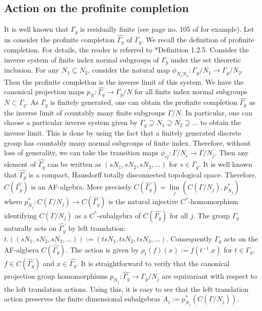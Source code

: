 \documentclass[a4paper,11pt,reqno]{amsart}
\theoremstyle{plain}
\theoremstyle{mainthmstyle}
\theoremstyle{named}
\numberwithin{equation}{section}
\begin{document}
\subsection{Action on the profinite completion} 
It is well known that $\Gamma_g$ is residually finite (see page no. 105 of \cite{Wikes-Profinite} for example). Let us consider the profinite completion $\widehat{\Gamma_g}$ of $\Gamma_g$. We recall the definition of profinite completion. For details, the reader is referred to \cite{Wikes-Profinite}*{Definition 1.2.5}. Consider the inverse system of finite index normal subgroups of $\Gamma_g$ under the set theoretic inclusion. For any $N_1\subseteq N_2$, consider the natural map $\phi_{N_1 N_2}:\Gamma_g/N_1\rightarrow \Gamma_g/N_2$. Then the profinite completion is the inverse limit of this system. We have the canonical projection maps $p_{N}:\widehat{\Gamma_g}\rightarrow \Gamma_g/N$ for all finite index normal subgroups $N\subset\Gamma_g$. As $\Gamma_g$ is finitely generated, one can obtain the profinite completion $\widehat{\Gamma_g}$ as the inverse limit of countably many finite subgroups $\Gamma/N$. In particular, one can choose a particular inverse system given by $\Gamma_g \supseteq N_{1}\supseteq N_{2} \supseteq \ldots$ to obtain the inverse limit. This is done by using the fact that a finitely generated discrete group has countably many normal subgroups of finite index. Therefore, without loss of generality, we can take the transition maps $\phi_{ij}:\Gamma/N_{i}\rightarrow\Gamma/N_{j}$. Then any element of $\widehat{\Gamma_g}$ can be written as $(sN_1,sN_2,sN_3,\ldots)$ for $s\in\Gamma_g$. It is well known that $\widehat{\Gamma_g}$ is a compact, Hausdorff totally disconnected topological space. Therefore, $C(\widehat{\Gamma_g})$ is an AF-algebra. More precisely $C(\widehat{\Gamma_g})=\lim\limits_{j}(C(\Gamma/N_j),p_{N_j}^{\ast})$ where $p_{N_j}^{\ast}:C(\Gamma/N_j)\rightarrow C(\widehat{\Gamma_g})$ is the natural injective $C^{\ast}$-homomorphism identifying $C(\Gamma/N_j)$ as a $C^{\ast}$-subalgebra of $C(\widehat{\Gamma_g})$ for all $j$. The group $\Gamma_g$ naturally acts on $\widehat{\Gamma_g}$ by left translation: $t.((sN_1,sN_2,sN_3,\ldots)):=(tsN_1,tsN_2,tsN_3,\ldots)$. Consequently $\Gamma_g$ acts on the AF-algbera $C(\widehat{\Gamma_{g}})$. The action is given by $\rho_t(f)(x):=f(t^{-1}.x)$ for $t\in \Gamma_g$, $f\in C(\widehat{\Gamma_g})$ and $x\in\widehat{\Gamma_g}$. It is straightforward to verify that the canonical projection group homomorphisms $p_{N_j}:\widehat{\Gamma_g}\rightarrow \Gamma_g/N_j$ are equivariant with respect to the left translation actions. Using this, it is easy to see that the left translation action preserves the finite dimensional subalgebras $A_{j}:=p_{N_j}^{\ast}(C(\Gamma/N_j))$. 
\end{document}
